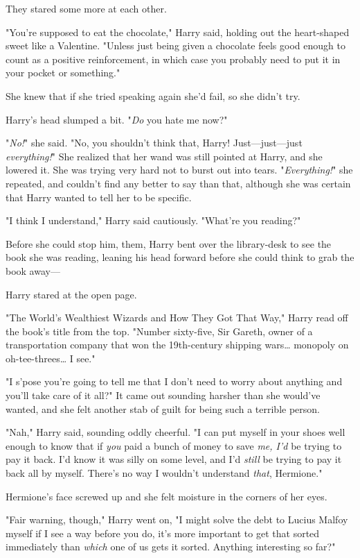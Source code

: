 They stared some more at each other.

"You're supposed to eat the chocolate," Harry said, holding out the 
heart-shaped sweet like a Valentine. "Unless just being given a chocolate feels 
good enough to count as a positive reinforcement, in which case you probably 
need to put it in your pocket or something."

She knew that if she tried speaking again she'd fail, so she didn't try.

Harry's head slumped a bit. "\emph{Do} you hate me now?"

"\emph{No!}" she said. "No, you shouldn't think that, Harry! Just---just---just 
\emph{everything!}" She realized that her wand was still pointed at Harry, and 
she lowered it. She was trying very hard not to burst out into tears. 
"\emph{Everything!}" she repeated, and couldn't find any better to say than 
that, although she was certain that Harry wanted to tell her to be specific.

"I think I understand," Harry said cautiously. "What're you reading?"

Before she could stop him, them, Harry bent over the library-desk to see the 
book she was reading, leaning his head forward before she could think to grab 
the book away---

Harry stared at the open page.

"The World's Wealthiest Wizards and How They Got That Way," Harry read off the 
book's title from the top. "Number sixty-five, Sir Gareth, owner of a 
transportation company that won the 19th-century shipping wars{\ldots} monopoly 
on oh-tee-threes{\ldots} I see."

"I s'pose you're going to tell me that I don't need to worry about anything and 
you'll take care of it all?" It came out sounding harsher than she would've 
wanted, and she felt another stab of guilt for being such a terrible person.

"Nah," Harry said, sounding oddly cheerful. "I can put myself in your shoes 
well enough to know that if \emph{you} paid a bunch of money to save \emph{me, 
I'd} be trying to pay it back. I'd know it was silly on some level, and I'd 
\emph{still} be trying to pay it back all by myself. There's no way I wouldn't 
understand \emph{that}, Hermione."

Hermione's face screwed up and she felt moisture in the corners of her eyes.

"Fair warning, though," Harry went on, "I might solve the debt to Lucius Malfoy 
myself if I see a way before you do, it's more important to get that sorted 
immediately than \emph{which} one of us gets it sorted. Anything interesting so 
far?"

